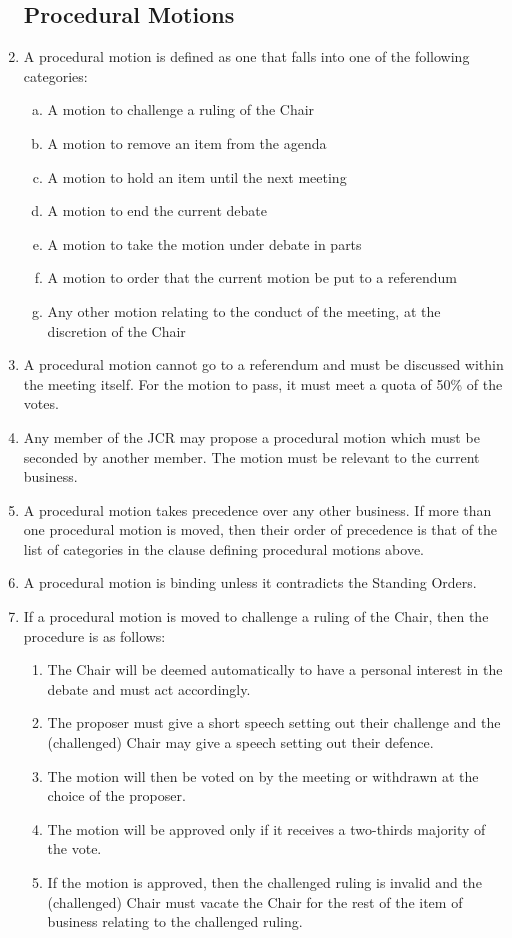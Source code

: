 \documentclass[12pt]{article}
\begin{document}
\begin{enumerate}
    \subsection{Procedural Motions}
    \item A procedural motion is defined as one that falls into one of the following categories:
    \begin{enumerate}[(a)]
        \item A motion to challenge a ruling of the Chair
        \item A motion to remove an item from the agenda
        \item A motion to hold an item until the next meeting
        \item A motion to end the current debate
        \item A motion to take the motion under debate in parts
        \item A motion to order that the current motion be put to a referendum
        \item Any other motion relating to the conduct of the meeting, at the discretion of the Chair
    \end{enumerate}
    \item A procedural motion cannot go to a referendum and must be discussed within the meeting itself. For the motion to pass, it must meet a quota of 50\% of the votes.
    \item Any member of the JCR may propose a procedural motion which must be seconded by another member. The motion must be relevant to the current business.
    \item A procedural motion takes precedence over any other business. If more than one procedural motion is moved, then their order of precedence is that of the list of categories in the clause defining procedural motions above.
    \item A procedural motion is binding unless it contradicts the Standing Orders.
    \item If a procedural motion is moved to challenge a ruling of the Chair, then the procedure is as follows:
    \begin{enumerate}
        \item The Chair will be deemed automatically to have a personal interest in the debate and must act accordingly.
        \item The proposer must give a short speech setting out their challenge and the (challenged) Chair may give a speech setting out their defence.
        \item The motion will then be voted on by the meeting or withdrawn at the choice of the proposer.
        \item The motion will be approved only if it receives a two-thirds majority of the vote.
        \item If the motion is approved, then the challenged ruling is invalid and the (challenged) Chair must vacate the Chair for the rest of the item of business relating to the challenged ruling.
    \end{enumerate}

\end{enumerate}
\end{document}
